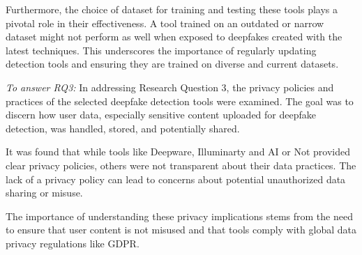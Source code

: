 Furthermore, the choice of dataset for training and testing these tools plays a pivotal role
in their effectiveness. A tool trained on an outdated or narrow dataset might not perform as
well when exposed to deepfakes created with the latest techniques. This underscores the
importance of regularly updating detection tools and ensuring they are trained on diverse
and current datasets.

\textit{To answer \ac{RQ}3:} In addressing Research Question 3, the privacy policies
and practices of the selected deepfake detection tools were examined. The goal was to
discern how user data, especially sensitive content uploaded for deepfake detection,
was handled, stored, and potentially shared.

It was found that while tools like Deepware, Illuminarty and AI or Not provided clear privacy
policies, others were not transparent about their data practices. The lack of a privacy
policy can lead to concerns about potential unauthorized data sharing or misuse.

The importance of understanding these privacy implications stems from the need to
ensure that user content is not misused and that tools comply with global data privacy
regulations like \ac{GDPR}.


